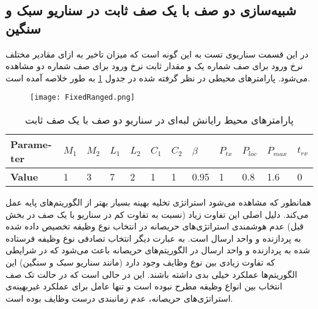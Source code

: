 \subsection{شبیه‌سازی دو صف با یک صف ثابت در سناریو سبک و سنگین}
در این قسمت سناریوی تست به این گونه است که میزان تاخیر به ازای مقادیر مختلف نرخ ورود برای صف شماره یک و مقدار ثابت نرخ ورود برای صف شماره دو مشاهده می‌شود. پارامترهای محیطی در نظر گرفته شده در جدول \ref{table:fixedranged} به طور خلاصه آمده است.
\begin{figure}[H]
	\texttt{[image: FixedRanged.png]}
\end{figure}
\begin{table}[H]
	\centering
	\begin{latin}
		\begin{tabular}{@{}llllllllllll@{}}
			\toprule
			\textbf{Parameter} & $M_1$ & $M_2$ & $L_1$ & $L_2$ & $C_1$ & $C_2$ & $\beta$ & $P_{tx}$ & $P_{loc}$ & $P_{max}$ & $t_{rx}$ \\ \midrule
			\textbf{Value}     & 1     & 3     & 7     & 2     & 1     & 1     & 0.95    & 1        & 0.8       & 1.6       & 0        \\ \bottomrule
		\end{tabular}
	\end{latin}
	\caption{پارامترهای محیط رایانش لبه‌ای در سناریو دو صف با یک صف ثابت}
	\label{table:fixedranged}
\end{table}
همانطور که مشاهده می‌شود استراتژی تخلیه بهینه بسیار بهتر از الگوریتم‌های پایه عمل می‌کند. دلیل اصلی این تفاوت زیاد (نسبت به تفاوت کم در سناریو با یک صف در بخش قبل) عدم هوشمندی استراتژی‌های حریصانه در انتخاب نوع وظیفه تخصیص داده شده به پردازنده و واحد ارسال است. به عبارت دیگر انتخاب تصادفی نوع وظیفه فرستاده شده به پردازنده و واحد ارسال در الگوریتم‌های حریصانه باعث می‌شود که در شرایطی که تفاوت زیادی بین نوع وظایف وجود دارد (مانند سناریو سبک و سنگین) این الگوریتم‌ها عملکرد خیلی بدی داشته باشند. این در حالی است که در حالت تک صف انتخاب بین انواع وظیفه مطرح نبوده است و تنها عامل برای عملکرد غیربهینه‌ی استراتژی‌های حریصانه، عدم زمانبندی درست وظایف بوده است.
